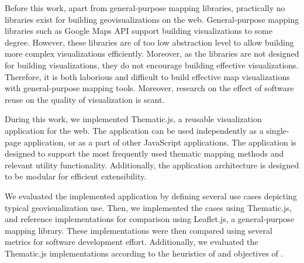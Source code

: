 
Before this work, apart from general-purpose mapping libraries, practically no libraries exist for building geovisualizations on the web. General-purpose mapping libraries such as Google Maps API support building visualizations to some degree. However, these libraries are of too low abstraction level to allow building more complex visualizations efficiently. Moreover, as the libraries are not designed for building visualizations, they do not encourage building effective visualizations. Therefore, it is both laborious and difficult to build effective map visualizations with general-purpose mapping tools. Moreover, research on the effect of software reuse on the quality of visualization is scant.

During this work, we implemented Thematic.js, a reusable visualization application for the web. The application can be used independently as a single-page application, or as a part of other JavaScript applications. The application is designed to support the most frequently used thematic mapping methods and relevant utility functionality. Additionally, the application architecture is designed to be modular for efficient extensibility.

We evaluated the implemented application by defining several use cases depicting typical geovisualization use. Then, we implemented the cases using Thematic.js, and reference implementations for comparison using Leaflet.js, a general-purpose mapping library. These implementations were then compared using several metrics for software development effort. Additionally, we evaluated the Thematic.js implementations according to the heuristics of \citet{zuk_heuristics_2006} and objectives of \citet{schlichtmann_visualization_2002}.

